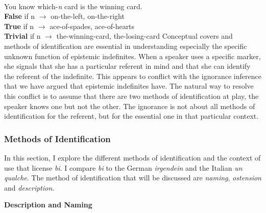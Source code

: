 \documentclass[output=paper,modfonts,nonflat,draftmode]{langsci/langscibook}
\begin{document}
\ea\label{owusu:ex45}\\
 You know which-\emph{n} card is the winning card.\\
 \textbf{False} if n $\longrightarrow$ {on-the-left, on-the-right}\\
 \textbf{True} if n $\longrightarrow$ {ace-of-spades, ace-of-hearts} \\
 \textbf{Trivial} if n $\longrightarrow$ {the-winning-card, the-losing-card}
\z 
Conceptual covers and methods of identification are essential in understanding especially the specific unknown function of epistemic indefinites. When a speaker uses a specific marker, she signals that she has a particular referent in mind and that she can identify the referent of the indefinite. This appears to conflict with the ignorance inference that we have argued that epistemic indefinites have. The natural way to resolve this conflict is to assume that there are two methods of identification at play, the speaker knows one but not the other. The ignorance is not about all methods of identification for the referent, but for the essential one in that particular context.  

\subsubsection{Methods of Identification}
In this section, I explore the different methods of identification and the context of use that license \emph{bi}. I compare \emph{bi} to the German \emph{irgendein} and the Italian \emph{un qualche}. The method of identification that will be discussed are \emph{naming}, \emph{ostension} and \emph{description}.

\textbf{Description and Naming}
\end{document}
